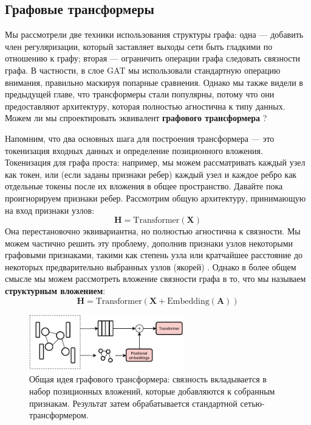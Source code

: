 \subsection{Графовые трансформеры}

Мы рассмотрели две техники использования структуры графа: одна — добавить член регуляризации, который заставляет выходы сети быть гладкими по отношению к графу; вторая — ограничить операции графа следовать связности графа. В частности, в слое GAT мы использовали стандартную операцию внимания, правильно маскируя попарные сравнения. Однако мы также видели в предыдущей главе, что трансформеры стали популярны, потому что они предоставляют архитектуру, которая полностью агностична к типу данных. Можем ли мы спроектировать эквивалент \textbf{графового трансформера} \cite{muller2023attending}?

Напомним, что два основных шага для построения трансформера — это токенизация входных данных и определение позиционного вложения. Токенизация для графа проста: например, мы можем рассматривать каждый узел как токен, или (если заданы признаки ребер) каждый узел и каждое ребро как отдельные токены после их вложения в общее пространство. Давайте пока проигнорируем признаки ребер. Рассмотрим общую архитектуру, принимающую на вход признаки узлов:
%
$$
\mathbf{H} = \text{Transformer}(\mathbf{X})
$$
%
Она перестановочно эквивариантна, но полностью агностична к связности. Мы можем частично решить эту проблему, дополнив признаки узлов некоторыми графовыми признаками, такими как степень узла или кратчайшее расстояние до некоторых предварительно выбранных узлов (якорей) \cite{rampavsek2022recipe,muller2023attending}. Однако в более общем смысле мы можем рассмотреть вложение связности графа в то, что мы называем \textbf{структурным вложением}:
%
$$
\mathbf{H} = \text{Transformer}(\mathbf{X} + \text{Embedding}(\mathbf{A}))
$$

\begin{figure}
    \centering
    \hspace{1em}\includegraphics[width=0.6\textwidth]{images/graph_transformer}
    \caption{Общая идея графового трансформера: связность вкладывается в набор позиционных вложений, которые добавляются к собранным признакам. Результат затем обрабатывается стандартной сетью-трансформером.}
    \label{fig:graph_transformer}
\end{figure}

